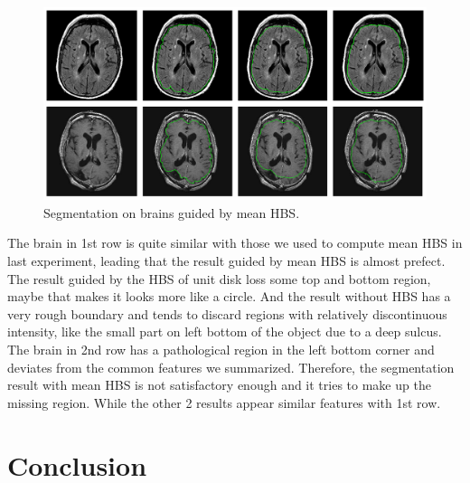 \documentclass[review,onefignum,onetabnum]{siamonline190516}
\begin{document}
\begin{figure}
    \begin{center}
        \includegraphics[width=15.5cm]{src/exp6.png}
    \end{center}
    \caption{Segmentation on brains guided by mean HBS.}
    \label{exp6}
\end{figure}

The brain in 1st row is quite similar with those we used to compute mean HBS in last experiment, leading that the result guided by mean HBS is almost prefect. The result guided by the HBS of unit disk loss some top and bottom region, maybe that makes it looks more like a circle. And the result without HBS has a very rough boundary and tends to discard regions with relatively discontinuous intensity, like the small part on left bottom of the object due to a deep sulcus. The brain in 2nd row has a pathological region in the left bottom corner and deviates from the common features we summarized. Therefore, the segmentation result with mean HBS is not satisfactory enough and it tries to make up the missing region. While the other 2 results appear similar features with 1st row.






\section{Conclusion}\label{conclusion}


\end{document}
